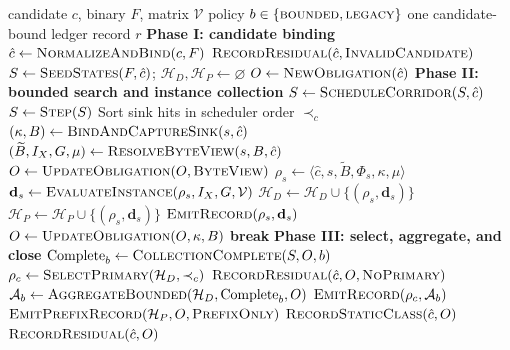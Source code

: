 \begin{algorithm}[!t]
\caption{Contract-guided evidence construction}
\label{alg:evidence}
\small
\begin{algorithmic}[1]
\Require candidate $c$, binary $F$, matrix $\mathcal{V}$
\Statex \hspace{\algorithmicindent}policy $b\in\{\textsc{bounded},\textsc{legacy}\}$
\Ensure one candidate-bound ledger record $r$
\Statex \textbf{Phase I: candidate binding}
\State $\hat c\gets\Call{NormalizeAndBind}{c,F}$
  \State \Return $\Call{RecordResidual}{\hat c,\textsc{InvalidCandidate}}$
\EndIf
\State $S\gets\Call{SeedStates}{F,\hat c}$; $\mathcal H_D,\mathcal H_P\gets\varnothing$
\State $O\gets\Call{NewObligation}{\hat c}$
\Statex \textbf{Phase II: bounded search and instance collection}
  \State $S\gets\Call{ScheduleCorridor}{S,\hat c}$
  \State $S\gets\Call{Step}{S}$
  \State Sort sink hits in scheduler order $\prec_c$
    \State $(\kappa,B)\gets\Call{BindAndCaptureSink}{s,\hat c}$
      \State $(\widetilde B,I_X,G,\mu)\gets\Call{ResolveByteView}{s,B,\hat c}$
      \If{$\mu=\bot$}
        \State $O\gets\Call{UpdateObligation}{O,\textsc{ByteView}}$
      \Else
        \State $\rho_s\gets\langle\hat c,s,\widetilde B,\Phi_s,\kappa,\mu\rangle$
        \State $\mathbf d_s\gets\Call{EvaluateInstance}{\rho_s,I_X,G,\mathcal{V}}$
          \State $\mathcal H_D\gets\mathcal H_D\cup\{(\rho_s,\mathbf d_s)\}$
        \Else
          \State $\mathcal H_P\gets\mathcal H_P\cup\{(\rho_s,\mathbf d_s)\}$
        \EndIf
          \State \Return $\Call{EmitRecord}{\rho_s,\mathbf d_s}$
        \EndIf
      \EndIf
    \Else
      \State $O\gets\Call{UpdateObligation}{O,\kappa,B}$
    \EndIf
  \EndFor
    \State \textbf{break}
  \EndIf
\EndWhile
\Statex \textbf{Phase III: select, aggregate, and close}
\State $\operatorname{Complete}_b\gets
  \Call{CollectionComplete}{S,O,b}$
  \State $\rho_c\gets\Call{SelectPrimary}{\mathcal H_D,\prec_c}$
    \State \Return $\Call{RecordResidual}{\hat c,O,\textsc{NoPrimary}}$
  \EndIf
  \State $\mathcal A_b\gets
    \Call{AggregateBounded}{\mathcal H_D,\operatorname{Complete}_b,O}$
  \State \Return $\Call{EmitRecord}{\rho_c,\mathcal A_b}$
\EndIf
{}
  \State \Return $\Call{EmitPrefixRecord}{\mathcal H_P,O,\textsc{PrefixOnly}}$
\EndIf
{}
  \State \Return $\Call{RecordStaticClass}{\hat c,O}$
\EndIf
\State \Return $\Call{RecordResidual}{\hat c,O}$
\end{algorithmic}
\end{algorithm}
\vspace{-4pt}


